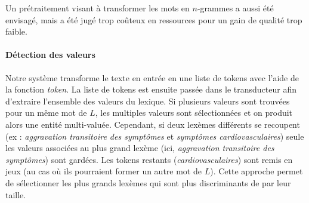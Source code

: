 Un prétraitement visant à transformer les mots en $n$-grammes a aussi été envisagé, mais a été jugé trop coûteux en ressources pour un gain de qualité trop faible.

\paragraph{Détection des valeurs}
Notre système transforme le texte en entrée en une liste de tokens avec l'aide de la fonction \textit{token}.
La liste de tokens est ensuite passée dans le transducteur afin d'extraire l'ensemble des valeurs du lexique.
Si plusieurs valeurs sont trouvées pour un même mot de $L$, les multiples valeurs sont sélectionnées et on produit alors une entité multi-valuée.
Cependant, si deux lexèmes différents se recoupent (ex : \emph{aggravation transitoire des symptômes} et \emph{symptômes cardiovasculaires}) seule les valeurs associées au plus grand lexème (ici, \emph{aggravation transitoire des symptômes}) sont gardées.
Les tokens restants (\emph{cardiovasculaires}) sont remis en jeux (au cas où ils pourraient former un autre mot de $L$).
Cette approche permet de sélectionner les plus grands lexèmes qui sont plus discriminants de par leur taille.

